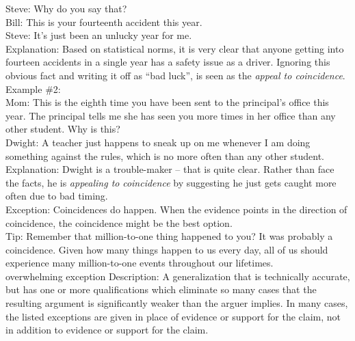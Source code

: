 \documentclass[a4paper,12pt,single,pdftex]{scrartcl}
\begin{document}
    
      Steve: Why do you say that?
    \\

    
      Bill: This is your fourteenth accident this year.
    \\

    
      Steve: It’s just been an unlucky year for me.
    \\

    
      Explanation: Based on statistical norms, it is very clear that anyone getting into fourteen accidents in a single year has a safety issue as a driver.  Ignoring this obvious fact and writing it off as “bad luck”, is seen as the {\it appeal to coincidence}.
    \\

    
      Example \#2: 
    \\

    
      Mom: This is the eighth time you have been sent to the principal's office this year.  The principal tells me she has seen you more times in her office than any other student.  Why is this?
    \\

    
      Dwight: A teacher just happens to sneak up on me whenever I am doing something against the rules, which is no more often than any other student.
    \\

    
      Explanation: Dwight is a trouble-maker -- that is quite clear.  Rather than face the facts, he is {\it appealing to} {\it coincidence }by suggesting he just gets caught more often due to bad timing.
    \\

    
      Exception: Coincidences do happen.  When the evidence points in the direction of coincidence, the coincidence might be the best option.
    \\

    
      Tip: Remember that million-to-one thing happened to you? It was probably a coincidence. Given how many things happen to us every day, all of us should experience many million-to-one events throughout our lifetimes.
    \\

  

overwhelming exception
    Description: A generalization that is technically accurate, but has one or more qualifications which eliminate so many cases that the resulting argument is significantly weaker than the arguer implies.  In many cases, the listed exceptions are given in place of evidence or support for the claim, not in addition to evidence or support for the claim.
\end{document}
